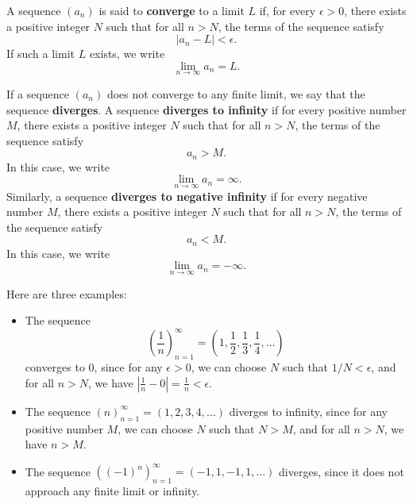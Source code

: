 \documentclass{article}
\begin{document}
\begin{definition}\label{def:convergent-sequence}
    A sequence \((a_n)\) is said to \textbf{converge} to a limit \(L\) if, for every \(\epsilon > 0\), there exists a positive integer \(N\) such that for all \(n > N\), the terms of the sequence satisfy
    \[|a_n - L| < \epsilon.\]
    If such a limit \(L\) exists, we write
    \[\lim_{n \to \infty} a_n = L.\]
\end{definition}

\begin{definition}\label{def:divergent-sequence}
    If a sequence \((a_n)\) does not converge to any finite limit, we say that the sequence \textbf{diverges}. A sequence \textbf{diverges to infinity} if for every positive number \(M\), there exists a positive integer \(N\) such that for all \(n > N\), the terms of the sequence satisfy
    \[a_n > M.\]
    In this case, we write
    \[\lim_{n \to \infty} a_n = \infty.\]
    Similarly, a sequence \textbf{diverges to negative infinity} if for every negative number \(M\), there exists a positive integer \(N\) such that for all \(n > N\), the terms of the sequence satisfy
    \[a_n < M.\]
    In this case, we write
    \[\lim_{n \to \infty} a_n = -\infty.\]
\end{definition}

\begin{example}\label{ex:limit-sequence-example}
Here are three examples:
\begin{itemize}
    \item The sequence
    \[\left(\frac{1}{n}\right)_{n=1}^\infty = \left(1, \frac{1}{2}, \frac{1}{3}, \frac{1}{4}, \ldots\right)\]
    converges to 0, since for any \(\epsilon > 0\), we can choose \(N\) such that \(1/N < \epsilon\), and for all \(n > N\), we have \(|\frac{1}{n} - 0| = \frac{1}{n} < \epsilon\).
    \item The sequence \((n)_{n=1}^\infty = (1, 2, 3, 4, \ldots)\) diverges to infinity, since for any positive number \(M\), we can choose \(N\) such that \(N > M\), and for all \(n > N\), we have \(n > M\).
    \item The sequence \(((-1)^n)_{n=1}^\infty = (-1, 1, -1, 1, \ldots)\) diverges, since it does not approach any finite limit or infinity.
\end{itemize}
\end{example}
\end{document}

